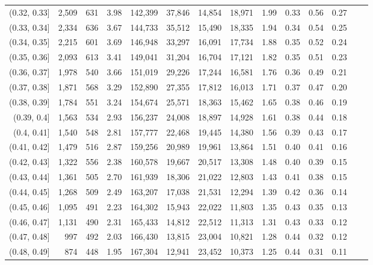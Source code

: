 \begin{tabular}{rrrrrrrrrrrrrr}
(0.32, 0.33]   &  2,509 &  631 &    3.98 &  142,399 &   37,846 &  14,854 &  18,971 &  1.99 &  0.33 &  0.56 &      0.27 \\
(0.33, 0.34]   &  2,334 &  636 &    3.67 &  144,733 &   35,512 &  15,490 &  18,335 &  1.94 &  0.34 &  0.54 &      0.25 \\
(0.34, 0.35]   &  2,215 &  601 &    3.69 &  146,948 &   33,297 &  16,091 &  17,734 &  1.88 &  0.35 &  0.52 &      0.24 \\
(0.35, 0.36]   &  2,093 &  613 &    3.41 &  149,041 &   31,204 &  16,704 &  17,121 &  1.82 &  0.35 &  0.51 &      0.23 \\
(0.36, 0.37]   &  1,978 &  540 &    3.66 &  151,019 &   29,226 &  17,244 &  16,581 &  1.76 &  0.36 &  0.49 &      0.21 \\
(0.37, 0.38]   &  1,871 &  568 &    3.29 &  152,890 &   27,355 &  17,812 &  16,013 &  1.71 &  0.37 &  0.47 &      0.20 \\
(0.38, 0.39]   &  1,784 &  551 &    3.24 &  154,674 &   25,571 &  18,363 &  15,462 &  1.65 &  0.38 &  0.46 &      0.19 \\
(0.39, 0.4]    &  1,563 &  534 &    2.93 &  156,237 &   24,008 &  18,897 &  14,928 &  1.61 &  0.38 &  0.44 &      0.18 \\
(0.4, 0.41]    &  1,540 &  548 &    2.81 &  157,777 &   22,468 &  19,445 &  14,380 &  1.56 &  0.39 &  0.43 &      0.17 \\
(0.41, 0.42]   &  1,479 &  516 &    2.87 &  159,256 &   20,989 &  19,961 &  13,864 &  1.51 &  0.40 &  0.41 &      0.16 \\
(0.42, 0.43]   &  1,322 &  556 &    2.38 &  160,578 &   19,667 &  20,517 &  13,308 &  1.48 &  0.40 &  0.39 &      0.15 \\
(0.43, 0.44]   &  1,361 &  505 &    2.70 &  161,939 &   18,306 &  21,022 &  12,803 &  1.43 &  0.41 &  0.38 &      0.15 \\
(0.44, 0.45]   &  1,268 &  509 &    2.49 &  163,207 &   17,038 &  21,531 &  12,294 &  1.39 &  0.42 &  0.36 &      0.14 \\
(0.45, 0.46]   &  1,095 &  491 &    2.23 &  164,302 &   15,943 &  22,022 &  11,803 &  1.35 &  0.43 &  0.35 &      0.13 \\
(0.46, 0.47]   &  1,131 &  490 &    2.31 &  165,433 &   14,812 &  22,512 &  11,313 &  1.31 &  0.43 &  0.33 &      0.12 \\
(0.47, 0.48]   &    997 &  492 &    2.03 &  166,430 &   13,815 &  23,004 &  10,821 &  1.28 &  0.44 &  0.32 &      0.12 \\
(0.48, 0.49]   &    874 &  448 &    1.95 &  167,304 &   12,941 &  23,452 &  10,373 &  1.25 &  0.44 &  0.31 &      0.11 \\

\end{tabular}
